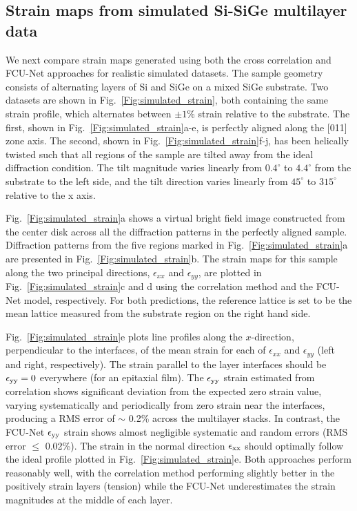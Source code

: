 \documentclass[%
 reprint,
superscriptaddress,
 amsmath,
 amssymb,
 prl,
]{revtex4-2}
\begin{document}
\subsection*{Strain maps from simulated Si-SiGe multilayer data}

We next compare strain maps generated using both the cross correlation and FCU-Net approaches for realistic simulated datasets. The sample geometry consists of alternating layers of Si and SiGe on a mixed SiGe substrate. Two datasets are shown in Fig.~\ref{Fig:simulated_strain}, both containing the same strain profile, which alternates between $\pm 1\%$ strain relative to the substrate. The first, shown in Fig.~\ref{Fig:simulated_strain}a-e, is perfectly aligned along the [011] zone axis. The second, shown in Fig.~\ref{Fig:simulated_strain}f-j, has been helically twisted such that all regions of the sample are tilted away from the ideal diffraction condition. The tilt magnitude varies linearly from $0.4^\circ$ to $4.4^\circ$ from the substrate to the left side, and the tilt direction varies linearly from $45^\circ$ to $315^\circ$ relative to the x axis.

Fig.~\ref{Fig:simulated_strain}a shows a virtual bright field image constructed from the center disk across all the diffraction patterns in the perfectly aligned sample. Diffraction patterns from the five regions marked in Fig.~\ref{Fig:simulated_strain}a are presented in Fig.~\ref{Fig:simulated_strain}b. The strain maps for this sample along the two principal directions, $\epsilon_{xx}$ and $\epsilon_{yy}$, are plotted in Fig.~\ref{Fig:simulated_strain}c and d using the correlation method and the FCU-Net model, respectively. For both predictions, the reference lattice is set to be the mean lattice measured from the substrate region on the right hand side. 

Fig.~\ref{Fig:simulated_strain}e plots line profiles along the $x$-direction, perpendicular to the interfaces, of the mean strain for each of $\epsilon_{xx}$ and $\epsilon_{yy}$ (left and right, respectively). The strain parallel to the layer interfaces should be $\epsilon_{\rm{yy}}=0$ everywhere (for an epitaxial film). The $\epsilon_{\rm{yy}}$ strain estimated from correlation shows significant deviation from the expected zero strain value, varying systematically and periodically from zero strain near the interfaces, producing a RMS error of $\sim$ 0.2\% across the multilayer stacks. In contrast, the FCU-Net $\epsilon_{\rm{yy}}$ strain shows almost negligible systematic and random errors (RMS error $\leq$ 0.02\%). The strain in the normal direction $\epsilon_{\rm{xx}}$ should optimally follow the ideal profile plotted in Fig.~\ref{Fig:simulated_strain}e. Both approaches perform reasonably well, with the correlation method performing slightly better in the positively strain layers (tension) while the FCU-Net underestimates the strain magnitudes at the middle of each layer.
\end{document}
